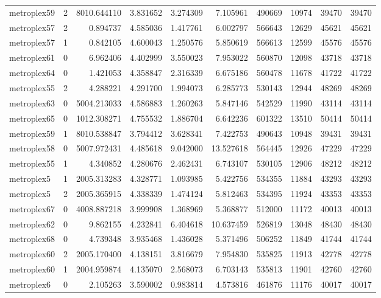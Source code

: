 \documentclass[../../../thesis.tex]{subfiles}
\begin{document}
\begin{longtable}{|l|r|r|r|r|r|r|r|r|r|}
metroplex59 & 2 & 8010.644110 & 3.831652 & 3.274309 & 7.105961 & 490669 & 10974 & 39470 & 39470 \\
metroplex57 & 2 & 0.894737 & 4.585036 & 1.417761 & 6.002797 & 566643 & 12629 & 45621 & 45621 \\
metroplex57 & 1 & 0.842105 & 4.600043 & 1.250576 & 5.850619 & 566613 & 12599 & 45576 & 45576 \\
metroplex61 & 0 & 6.962406 & 4.402999 & 3.550023 & 7.953022 & 560870 & 12098 & 43718 & 43718 \\
metroplex64 & 0 & 1.421053 & 4.358847 & 2.316339 & 6.675186 & 560478 & 11678 & 41722 & 41722 \\
metroplex55 & 2 & 4.288221 & 4.291700 & 1.994073 & 6.285773 & 530143 & 12944 & 48269 & 48269 \\
metroplex63 & 0 & 5004.213033 & 4.586883 & 1.260263 & 5.847146 & 542529 & 11990 & 43114 & 43114 \\
metroplex65 & 0 & 1012.308271 & 4.755532 & 1.886704 & 6.642236 & 601322 & 13510 & 50414 & 50414 \\
metroplex59 & 1 & 8010.538847 & 3.794412 & 3.628341 & 7.422753 & 490643 & 10948 & 39431 & 39431 \\
metroplex58 & 0 & 5007.972431 & 4.485618 & 9.042000 & 13.527618 & 564445 & 12926 & 47229 & 47229 \\
metroplex55 & 1 & 4.340852 & 4.280676 & 2.462431 & 6.743107 & 530105 & 12906 & 48212 & 48212 \\
metroplex5 & 1 & 2005.313283 & 4.328771 & 1.093985 & 5.422756 & 534355 & 11884 & 43293 & 43293 \\
metroplex5 & 2 & 2005.365915 & 4.338339 & 1.474124 & 5.812463 & 534395 & 11924 & 43353 & 43353 \\
metroplex67 & 0 & 4008.887218 & 3.999908 & 1.368969 & 5.368877 & 512000 & 11172 & 40013 & 40013 \\
metroplex62 & 0 & 9.862155 & 4.232841 & 6.404618 & 10.637459 & 526819 & 13048 & 48430 & 48430 \\
metroplex68 & 0 & 4.739348 & 3.935468 & 1.436028 & 5.371496 & 506252 & 11849 & 41744 & 41744 \\
metroplex60 & 2 & 2005.170400 & 4.138151 & 3.816679 & 7.954830 & 535825 & 11913 & 42778 & 42778 \\
metroplex60 & 1 & 2004.959874 & 4.135070 & 2.568073 & 6.703143 & 535813 & 11901 & 42760 & 42760 \\
metroplex6 & 0 & 2.105263 & 3.590002 & 0.983814 & 4.573816 & 461876 & 11176 & 40017 & 40017 \\

\end{longtable}
\end{document}
